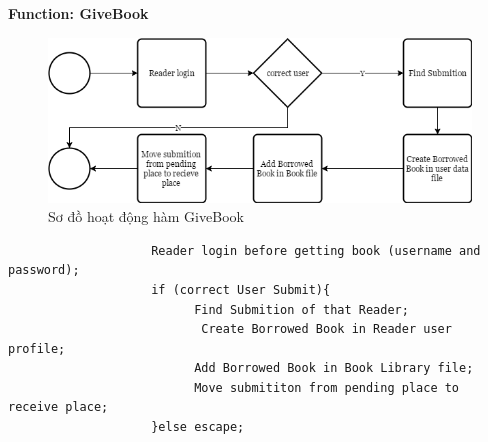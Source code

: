 \documentclass[12pt,a4paper]{report}
\begin{document}
                \textbf{Function: GiveBook}
                \begin{figure}[H]
                    \centering
                    \label{G:givebook}
                    \includegraphics[scale = .4]{givebook.png}
                    \caption{Sơ đồ hoạt động hàm GiveBook}
                \end{figure}
                \begin{verbatim}
                    Reader login before getting book (username and password);
                    if (correct User Submit){
                          Find Submition of that Reader;
                           Create Borrowed Book in Reader user profile;
                          Add Borrowed Book in Book Library file;
                          Move submititon from pending place to receive place;
                    }else escape;
                \end{verbatim}
\end{document}
